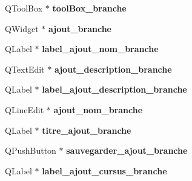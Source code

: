 \begin{DoxyCompactItemize}
\item 
\hypertarget{class_ui___administration_a1e19e5d10f4a6478699ba066c8fccd02}{Q\+Tool\+Box $\ast$ {\bfseries tool\+Box\+\_\+branche}}\label{class_ui___administration_a1e19e5d10f4a6478699ba066c8fccd02}

\item 
\hypertarget{class_ui___administration_acf9b70e07efe727f3b679a98643db5b3}{Q\+Widget $\ast$ {\bfseries ajout\+\_\+branche}}\label{class_ui___administration_acf9b70e07efe727f3b679a98643db5b3}

\item 
\hypertarget{class_ui___administration_a6667c5d89159ded7167c04b097a9315c}{Q\+Label $\ast$ {\bfseries label\+\_\+ajout\+\_\+nom\+\_\+branche}}\label{class_ui___administration_a6667c5d89159ded7167c04b097a9315c}

\item 
\hypertarget{class_ui___administration_af4b054063d690c1b79fe7b4d9dab21e1}{Q\+Text\+Edit $\ast$ {\bfseries ajout\+\_\+description\+\_\+branche}}\label{class_ui___administration_af4b054063d690c1b79fe7b4d9dab21e1}

\item 
\hypertarget{class_ui___administration_aa1fd611967cbd44c067044bda1eb9222}{Q\+Label $\ast$ {\bfseries label\+\_\+ajout\+\_\+description\+\_\+branche}}\label{class_ui___administration_aa1fd611967cbd44c067044bda1eb9222}

\item 
\hypertarget{class_ui___administration_a7e4544068e286694120a702f12c8c8f0}{Q\+Line\+Edit $\ast$ {\bfseries ajout\+\_\+nom\+\_\+branche}}\label{class_ui___administration_a7e4544068e286694120a702f12c8c8f0}

\item 
\hypertarget{class_ui___administration_a7fda7b72264ad3de946ed7d9c4921ed4}{Q\+Label $\ast$ {\bfseries titre\+\_\+ajout\+\_\+branche}}\label{class_ui___administration_a7fda7b72264ad3de946ed7d9c4921ed4}

\item 
\hypertarget{class_ui___administration_a9653907f21e65af5100e59f1b2ba03ac}{Q\+Push\+Button $\ast$ {\bfseries sauvegarder\+\_\+ajout\+\_\+branche}}\label{class_ui___administration_a9653907f21e65af5100e59f1b2ba03ac}

\item 
\hypertarget{class_ui___administration_a47514de6b2c8626710db7175a0e65745}{Q\+Label $\ast$ {\bfseries label\+\_\+ajout\+\_\+cursus\+\_\+branche}}\label{class_ui___administration_a47514de6b2c8626710db7175a0e65745}


\end{DoxyCompactItemize}
